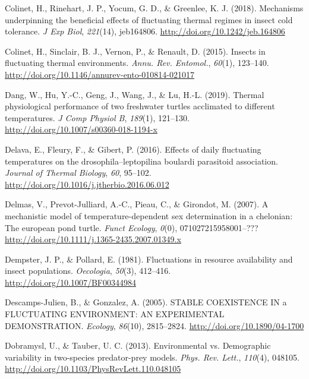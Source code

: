 \documentclass[12pt,twoside]{reedthesis}
\begin{document}
\leavevmode\hypertarget{ref-colinet_mechanisms_2018}{}%
Colinet, H., Rinehart, J. P., Yocum, G. D., \& Greenlee, K. J. (2018). Mechanisms underpinning the beneficial effects of fluctuating thermal regimes in insect cold tolerance. \emph{J Exp Biol}, \emph{221}(14), jeb164806. \url{http://doi.org/10.1242/jeb.164806}

\leavevmode\hypertarget{ref-colinet_insects_2015}{}%
Colinet, H., Sinclair, B. J., Vernon, P., \& Renault, D. (2015). Insects in fluctuating thermal environments. \emph{Annu. Rev. Entomol.}, \emph{60}(1), 123--140. \url{http://doi.org/10.1146/annurev-ento-010814-021017}

\leavevmode\hypertarget{ref-dang_thermal_2019}{}%
Dang, W., Hu, Y.-C., Geng, J., Wang, J., \& Lu, H.-L. (2019). Thermal physiological performance of two freshwater turtles acclimated to different temperatures. \emph{J Comp Physiol B}, \emph{189}(1), 121--130. \url{http://doi.org/10.1007/s00360-018-1194-x}

\leavevmode\hypertarget{ref-delava_effects_2016}{}%
Delava, E., Fleury, F., \& Gibert, P. (2016). Effects of daily fluctuating temperatures on the drosophila--leptopilina boulardi parasitoid association. \emph{Journal of Thermal Biology}, \emph{60}, 95--102. \url{http://doi.org/10.1016/j.jtherbio.2016.06.012}

\leavevmode\hypertarget{ref-delmas_mechanistic_2007}{}%
Delmas, V., Prevot-Julliard, A.-C., Pieau, C., \& Girondot, M. (2007). A mechanistic model of temperature-dependent sex determination in a chelonian: The european pond turtle. \emph{Funct Ecology}, \emph{0}(0), 071027215958001--??? \url{http://doi.org/10.1111/j.1365-2435.2007.01349.x}

\leavevmode\hypertarget{ref-dempster_fluctuations_1981}{}%
Dempster, J. P., \& Pollard, E. (1981). Fluctuations in resource availability and insect populations. \emph{Oecologia}, \emph{50}(3), 412--416. \url{http://doi.org/10.1007/BF00344984}

\leavevmode\hypertarget{ref-descamps-julien_stable_2005}{}%
Descamps-Julien, B., \& Gonzalez, A. (2005). STABLE COEXISTENCE IN a FLUCTUATING ENVIRONMENT: AN EXPERIMENTAL DEMONSTRATION. \emph{Ecology}, \emph{86}(10), 2815--2824. \url{http://doi.org/10.1890/04-1700}

\leavevmode\hypertarget{ref-dobramysl_environmental_2013}{}%
Dobramysl, U., \& Tauber, U. C. (2013). Environmental vs. Demographic variability in two-species predator-prey models. \emph{Phys. Rev. Lett.}, \emph{110}(4), 048105. \url{http://doi.org/10.1103/PhysRevLett.110.048105}
\end{document}
